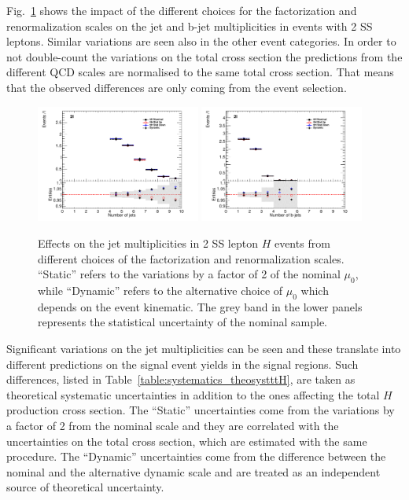 Fig.~\ref{figure:systematics_theosyst} shows the impact of the different choices for the factorization and renormalization scales on the jet and b-jet multiplicities in events with 2 SS leptons. Similar variations are seen also in the other event categories. In order to not double-count the variations on the total cross section the predictions from the different QCD scales are normalised to the same total cross section. That means that the observed differences are only coming from the event selection.
\begin{figure}[htbp]
\begin{center}
\includegraphics[width=0.48\textwidth]{figs/tth/plot_2l_NJet_ttH_nom}
\includegraphics[width=0.48\textwidth]{figs/tth/plot_2l_NJetBTag_ttH_nom}
\caption{Effects on the jet multiplicities in 2 SS lepton \ttbar$H$ events from different choices of the factorization and renormalization scales. ``Static'' refers to the variations by a factor of 2 of the nominal $\mu_{0}$, while ``Dynamic'' refers to the alternative choice of $\mu_{0}$ which depends on the event kinematic. The grey band in the lower panels represents the statistical uncertainty of the nominal sample.}
\label{figure:systematics_theosyst}
\end{center}
\end{figure}
Significant variations on the jet multiplicities can be seen and these translate into different predictions on the signal event yields in the signal regions. Such differences, listed in Table~\ref{table:systematics_theosystttH}, are taken as theoretical systematic uncertainties in addition to the ones affecting the total \ttbar$H$ production cross section. The ``Static'' uncertainties come from the variations by a factor of 2 from the nominal scale and they are correlated with the uncertainties on the total cross section, which are estimated with the same procedure. The ``Dynamic''  uncertainties come from the difference between the nominal and the alternative dynamic scale and are treated as an independent source of theoretical uncertainty. 

